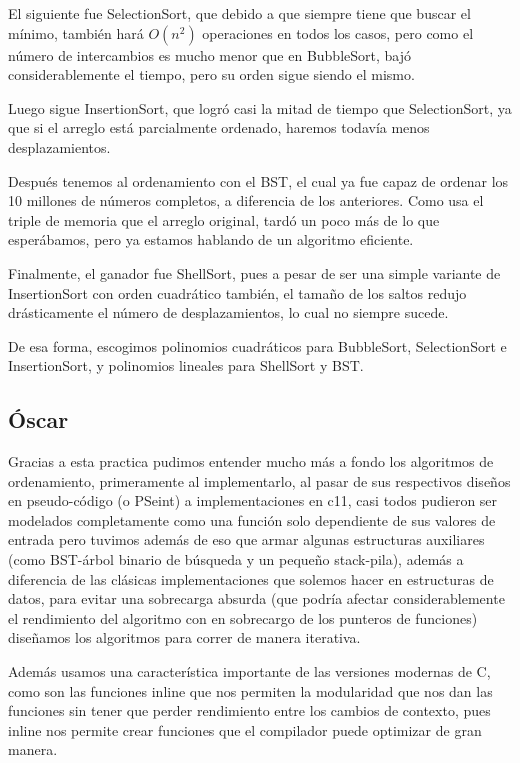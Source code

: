 \documentclass[12pt, fleqn]{report}                             %
\theoremstyle{break}                                            %
\begin{document}
    	    El siguiente fue SelectionSort, que debido a que siempre tiene que buscar el mínimo, también hará $O(n^2)$ operaciones en todos los casos, pero como el número de intercambios es mucho menor que en BubbleSort, bajó considerablemente el tiempo, pero su orden sigue siendo el mismo.
    	    
    	    Luego sigue InsertionSort, que logró casi la mitad de tiempo que SelectionSort, ya que si el arreglo está parcialmente ordenado, haremos todavía menos desplazamientos.
    	    
    	    Después tenemos al ordenamiento con el BST, el cual ya fue capaz de ordenar los 10 millones de números completos, a diferencia de los anteriores. Como usa el triple de memoria que el arreglo original, tardó un poco más de lo que esperábamos, pero ya estamos hablando de un algoritmo eficiente.
    	    
    	    Finalmente, el ganador fue ShellSort, pues a pesar de ser una simple variante de InsertionSort con orden cuadrático también, el tamaño de los saltos redujo drásticamente el número de desplazamientos, lo cual no siempre sucede.
    	    
    	    De esa forma, escogimos polinomios cuadráticos para BubbleSort, SelectionSort e InsertionSort, y polinomios lineales para ShellSort y BST.
    	

    	    
    	
    	\subsection{Óscar}
    	
    	    Gracias a esta practica pudimos entender mucho más a fondo los algoritmos de ordenamiento, primeramente al implementarlo, al pasar de sus respectivos 
    	    diseños en pseudo-código (o PSeint) a implementaciones en c11, casi todos pudieron ser modelados completamente como una función solo dependiente de sus valores de entrada
    	    pero tuvimos además de eso que armar algunas estructuras auxiliares (como BST-árbol binario de búsqueda y un pequeño stack-pila), además a diferencia de las clásicas
    	    implementaciones que solemos hacer en estructuras de datos, para evitar una sobrecarga absurda (que podría afectar considerablemente el rendimiento del algoritmo con en sobrecargo
    	    de los punteros de funciones) diseñamos los algoritmos para correr de manera iterativa.
    	    
    	    Además usamos una característica importante de las versiones modernas de C, como son las funciones inline que nos permiten la modularidad que nos dan las funciones
    	    sin tener que perder rendimiento entre los cambios de contexto, pues inline nos permite crear funciones que el compilador puede optimizar de gran manera.
    	    
\end{document}
